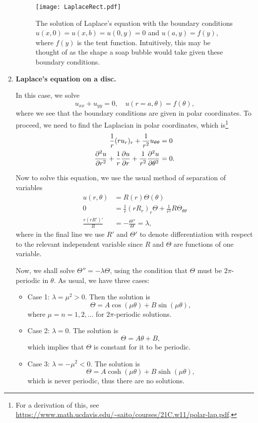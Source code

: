 \begin{enumerate}
	\begin{figure}[!ht]
		\centering
		\texttt{[image: LaplaceRect.pdf]}
		\caption{The solution of Laplace's equation with the boundary conditions $u(x,0) = u(x,b) = u(0,y) = 0$ and $u(a,y) = f(y)$, where $f(y)$ is the tent function. Intuitively, this may be thought of as the shape a soap bubble would take given these boundary conditions.}
		\label{fig:laplacerect}
	\end{figure}
	
	\item \textbf{Laplace's equation on a disc.}
	
	In this case, we solve
	\[
	u_{xx} + u_{yy} = 0, \quad u(r=a, \theta) = f(\theta),
	\]
	where we see that the boundary conditions are given in polar coordinates. To proceed, we need to find the Laplacian in polar coordinates, which is\footnote{For a derivation of this, see \url{https://www.math.ucdavis.edu/~saito/courses/21C.w11/polar-lap.pdf}.}
	\begin{align*}
		\frac{1}{r}(r u_r)_r + \frac{1}{r^2}u_{\theta\theta} &= 0 \\
		\frac{\partial^2u}{\partial r^2} + \frac{1}{r}\frac{\partial u}{\partial r} + \frac{1}{r^2}\frac{\partial^2u}{\partial\theta^2} &= 0.
	\end{align*}
	
	Now to solve this equation, we use the usual method of separation of variables
	\begin{align*}
		u(r, \theta) &= R(r)\Theta(\theta) \\
		0 &= \frac{1}{r}(r R_r)_r\Theta + \frac{1}{r^2}R \Theta_{\theta\theta} \\
		\frac{r(rR')'}{R} &= -\frac{\Theta''}{\Theta} = \lambda,
	\end{align*}
	where in the final line we use $R'$ and $\Theta'$ to denote differentiation with respect to the relevant independent variable since $R$ and $\Theta$ are functions of one variable.
	
	Now, we shall solve $\Theta'' = -\lambda\Theta$, using the condition that $\Theta$ must be $2\pi$-periodic in $\theta$. As usual, we have three cases:
	\begin{itemize}
		\item Case 1: $\lambda = \mu^2 > 0$. Then the solution is
		\[
		\Theta = A\cos(\mu\theta) + B\sin(\mu\theta),
		\]
		where $\mu = n = 1, 2, \dots$ for $2\pi$-periodic solutions.
		\item Case 2: $\lambda=0$. The solution is
		\[
		\Theta = A\theta + B,
		\]
		which implies that $\Theta$ is constant for it to be periodic.
		\item Case 3: $\lambda = -\mu^2 < 0$. The solution is
		\[
		\Theta = A\cosh(\mu\theta) + B\sinh(\mu\theta),
		\]
		which is never periodic, thus there are no solutions.
	\end{itemize}
	

\end{enumerate}
